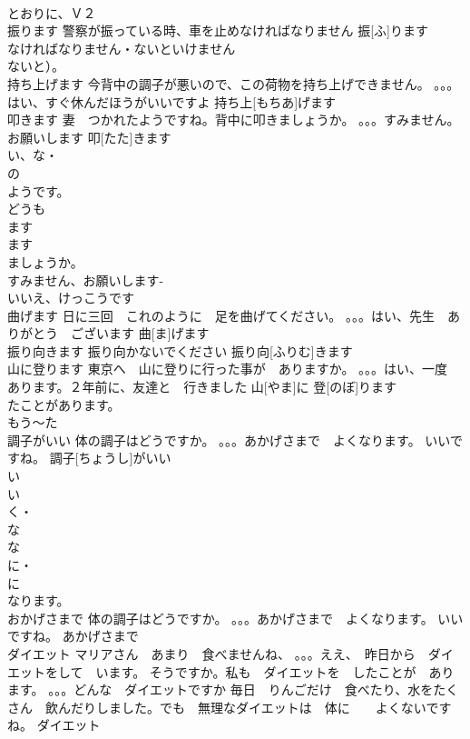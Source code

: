 \documentclass[8pt]{extreport}
\begin{document}
\begin{CJK}{UTF8}{min}
\\	とおりに、Ｖ２
\\	振ります	警察が振っている時、車を止めなければなりません	振[ふ]ります			
\\	なければなりません・ないといけません
\\	ないと）。
\\	持ち上げます	今背中の調子が悪いので、この荷物を持ち上げできません。 。。。はい、すぐ休んだほうがいいですよ	持ち上[もちあ]げます			
\\	叩きます	妻　つかれたようですね。背中に叩きましょうか。 。。。すみません。お願いします	叩[たた]きます			
\\	い、な・
\\	の
\\	ようです。
\\	どうも
\\	ます
\\	ます
\\	ましょうか。
\\	すみません、お願いします- 
\\	いいえ、けっこうです　
\\	曲げます	日に三回　これのように　足を曲げてください。 。。。はい、先生　ありがとう　ございます	曲[ま]げます			
\\	振り向きます	振り向かないでください	振り向[ふりむ]きます			
\\	山に登ります	東京へ　山に登りに行った事が　ありますか。 。。。はい、一度　あります。２年前に、友達と　行きました	山[やま]に 登[のぼ]ります			
\\	たことがあります。
\\	もう～た
\\	調子がいい	体の調子はどうですか。 。。。あかげさまで　よくなります。 いいですね。	調子[ちょうし]がいい			
\\	い
\\	い
\\	く・
\\	な
\\	な
\\	に・
\\	に　
\\	なります。
\\	おかげさまで	体の調子はどうですか。 。。。あかげさまで　よくなります。 いいですね。	あかげさまで			
\\	ダイエット	マリアさん　あまり　食べませんね、 。。。ええ、　昨日から　ダイエットをして　います。 そうですか。私も　ダイエットを　したことが　あります。 。。。どんな　ダイエットですか 毎日　りんごだけ　食べたり、水をたくさん　飲んだりしました。でも　無理なダイエットは　体に　　よくないですね。	ダイエット			

\end{CJK}
\end{document}
